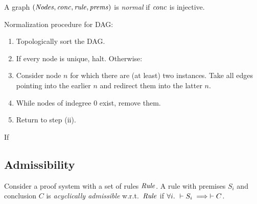 \begin{definition}
    A graph $(\mathit{Nodes},\mathit{conc},\mathit{rule},\mathit{prems})$
    is \emph{normal} if
    $\mathit{conc}$ is injective.
\end{definition}

Normalization procedure for DAG:
\begin{enumerate}[label=(\roman*)]
    \item Topologically sort the DAG.
    \item If every node is unique, halt. Otherwise:
    \item Consider node $n$ for which there are (at least) two instances.
        Take all edges pointing into the earlier $n$ and redirect them into the latter $n$.
    \item While nodes of indegree 0 exist, remove them.
    \item Return to step (ii).
\end{enumerate}

\begin{conjecture}
If 
\end{conjecture}


\subsection{Admissibility}

\begin{definition}
    Consider a proof system with a set of rules $\mathit{Rule}$.
    A rule with premises $S_i$ and conclusion $C$ 
    is \emph{acyclically admissible} w.r.t.\ $\mathit{Rule}$ if
    $\forall i.\ \vdash S_i \implies \vdash C$.
\end{definition}